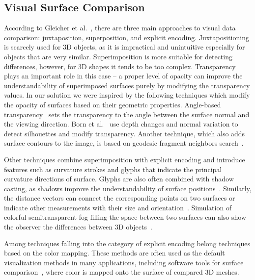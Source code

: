 \documentclass[final,5p,times]{elsarticle}
\begin{document}
\subsection{Visual Surface Comparison}
According to Gleicher et al.~\cite{gleicher2011visual}, there are three main approaches to visual data comparison: juxtaposition, superposition, and explicit encoding. 
Juxtapositioning is scarcely used for 3D objects, as it is impractical and unintuitive especially for objects that are very similar. 
Superimposition is more suitable for detecting differences, however, for 3D shapes it tends to be too complex. 
Transparency plays an important role in this case -- a proper level of opacity can improve the understandability of superimposed surfaces purely by modifying the transparency values. 
In our solution we were inspired by the following techniques which modify the opacity of surfaces based on their geometric properties. 
Angle-based transparency~\cite{hummel2010iris} sets the transparency to the angle between the surface normal and the viewing direction. 
Born et al.~\cite{born2009illustrative} use depth changes and normal variation to detect silhouettes and modify transparency. 
Another technique, which also adds surface contours to the image, is based on geodesic fragment neighbors search~\cite{carnecky2013smart}. 

Other techniques \cite{interrante1997conveying,diewald2000anisotropic,weigle2005visualizing} combine superimposition with explicit encoding and introduce features such as curvature strokes and glyphs that indicate the principal curvature directions of surface. 
Glyphs are also often combined with shadow casting, as shadows improve the understandability of surface positions~\cite{weigle2005visualizing}. 
Similarly, the distance vectors can connect the corresponding points on two surfaces or indicate other measurements with their size and orientation~\cite{busking2011image}. 
Simulation of colorful semitransparent fog filling the space between two surfaces can also show the observer the differences between 3D objects~\cite{busking2011image}.

Among techniques falling into the category of explicit encoding belong techniques based on the color mapping. 
These methods are often used as the default visualization methods in many applications, including software tools for surface comparison~\cite{CCompare,ymca}, where color is mapped onto the surface of compared 3D meshes. 
\end{document}
